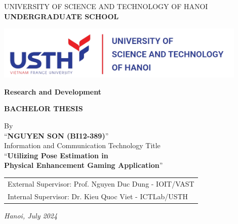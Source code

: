 \documentclass[12pt]{article}
\begin{document}
\begin{titlepage}
    \centering
    \vspace*{1cm}

    \large
    UNIVERSITY OF SCIENCE AND TECHNOLOGY OF HANOI\\

    \Large
    \textbf{UNDERGRADUATE SCHOOL}

    \vspace{1.5cm}

    \includegraphics[width=0.9\textwidth]{usth.png}

    \vspace{1.5cm}

    {\Large \textbf{Research and Development}}\\

    \vspace{0.5cm}

    {\Huge \textbf{BACHELOR THESIS}}

    \vspace{2cm}

    By\\
    \vspace{0.5cm}
    \Large ``\textbf{NGUYEN SON (BI12-389)}''\\
    \Large Information and Communication Technology
    \vfill
    Title\\
    \vspace{0.5cm}
    {\LARGE ``\textbf{Utilizing Pose Estimation in \\Physical Enhancement Gaming Application}''}

    \vspace{2cm}

    \begin{tabular}{@{}l@{}}
        External Supervisor: Prof. Nguyen Duc Dung - IOIT/VAST \\
        Internal Supervisor: Dr. Kieu Quoc Viet - ICTLab/USTH
    \end{tabular}
    \vfill
    \normalsize{\textit{Hanoi, July 2024}}

\end{titlepage}
\end{document}
